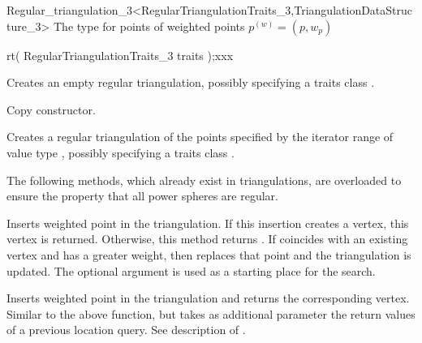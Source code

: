 \begin{ccRefClass}{Regular_triangulation_3<RegularTriangulationTraits_3,TriangulationDataStructure_3>}
{The type for points
 of weighted points ${p}^{(w)}=(p,w_p)$}
\ccGlue
{}

\ccCreation
{}


{rt( RegularTriangulationTraits_3 traits );xxx}{}

{Creates an empty regular triangulation, possibly specifying a traits class
.}

 {Copy constructor.}

{Creates a regular triangulation of the points specified by the iterator range
\ccc{[first,last)} of value type , possibly specifying a
traits class .}

\ccOperations



The following methods, which already exist in triangulations, are
overloaded to ensure the property that all power spheres are regular.

{Inserts weighted point  in the triangulation. If this
insertion creates a vertex, this vertex is returned. Otherwise, this
method returns .  If  coincides with an existing vertex and
has a greater weight, then  replaces that point and the triangulation
is updated.
The optional argument  is used as a starting place for the search.}

{Inserts weighted point  in the triangulation and returns the corresponding
 vertex. Similar to the above  function, but takes as additional
 parameter the return values of a previous location query.  See description of
 .}


\end{ccRefClass}

